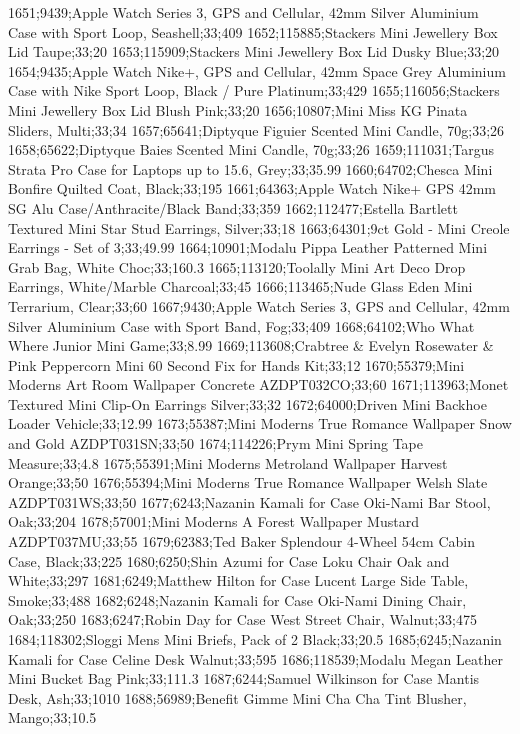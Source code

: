 1651;9439;Apple Watch Series 3, GPS and Cellular, 42mm Silver Aluminium Case with Sport Loop, Seashell;33;409
1652;115885;Stackers Mini Jewellery Box Lid Taupe;33;20
1653;115909;Stackers Mini Jewellery Box Lid Dusky Blue;33;20
1654;9435;Apple Watch Nike+, GPS and Cellular, 42mm Space Grey Aluminium Case with Nike Sport Loop, Black / Pure Platinum;33;429
1655;116056;Stackers Mini Jewellery Box Lid Blush Pink;33;20
1656;10807;Mini Miss KG Pinata Sliders, Multi;33;34
1657;65641;Diptyque Figuier Scented Mini Candle, 70g;33;26
1658;65622;Diptyque Baies Scented Mini Candle, 70g;33;26
1659;111031;Targus Strata Pro Case for Laptops up to 15.6, Grey;33;35.99
1660;64702;Chesca Mini Bonfire Quilted Coat, Black;33;195
1661;64363;Apple Watch Nike+ GPS 42mm SG Alu Case/Anthracite/Black Band;33;359
1662;112477;Estella Bartlett Textured Mini Star Stud Earrings, Silver;33;18
1663;64301;9ct Gold - Mini Creole Earrings - Set of 3;33;49.99
1664;10901;Modalu Pippa Leather Patterned Mini Grab Bag, White Choc;33;160.3
1665;113120;Toolally Mini Art Deco Drop Earrings, White/Marble Charcoal;33;45
1666;113465;Nude Glass Eden Mini Terrarium, Clear;33;60
1667;9430;Apple Watch Series 3, GPS and Cellular, 42mm Silver Aluminium Case with Sport Band, Fog;33;409
1668;64102;Who What Where Junior Mini Game;33;8.99
1669;113608;Crabtree & Evelyn Rosewater & Pink Peppercorn Mini 60 Second Fix for Hands Kit;33;12
1670;55379;Mini Moderns Art Room Wallpaper Concrete AZDPT032CO;33;60
1671;113963;Monet Textured Mini Clip-On Earrings Silver;33;32
1672;64000;Driven Mini Backhoe Loader Vehicle;33;12.99
1673;55387;Mini Moderns True Romance Wallpaper Snow and Gold AZDPT031SN;33;50
1674;114226;Prym Mini Spring Tape Measure;33;4.8
1675;55391;Mini Moderns Metroland Wallpaper Harvest Orange;33;50
1676;55394;Mini Moderns True Romance Wallpaper Welsh Slate AZDPT031WS;33;50
1677;6243;Nazanin Kamali for Case Oki-Nami Bar Stool, Oak;33;204
1678;57001;Mini Moderns A Forest Wallpaper Mustard AZDPT037MU;33;55
1679;62383;Ted Baker Splendour 4-Wheel 54cm Cabin Case, Black;33;225
1680;6250;Shin Azumi for Case Loku Chair Oak and White;33;297
1681;6249;Matthew Hilton for Case Lucent Large Side Table, Smoke;33;488
1682;6248;Nazanin Kamali for Case Oki-Nami Dining Chair, Oak;33;250
1683;6247;Robin Day for Case West Street Chair, Walnut;33;475
1684;118302;Sloggi Mens Mini Briefs, Pack of 2 Black;33;20.5
1685;6245;Nazanin Kamali for Case Celine Desk Walnut;33;595
1686;118539;Modalu Megan Leather Mini Bucket Bag Pink;33;111.3
1687;6244;Samuel Wilkinson for Case Mantis Desk, Ash;33;1010
1688;56989;Benefit Gimme Mini Cha Cha Tint Blusher, Mango;33;10.5
